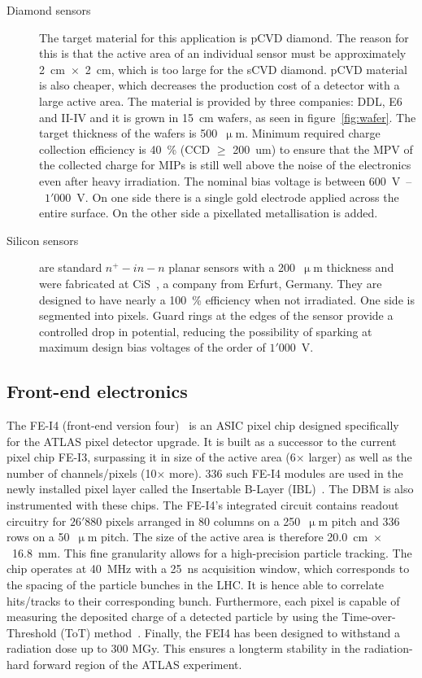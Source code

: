 \begin{description}
\item[Diamond sensors] The target material for this application is pCVD diamond. The reason for this is that the active area of an individual sensor must be approximately 2~cm~$\times$~2~cm, which is too large for the sCVD diamond. pCVD material is also cheaper, which decreases the production cost of a detector with a large active area. The material is provided by three companies: DDL, E6 and II-IV and it is grown in 15~cm wafers, as seen in figure~\ref{fig:wafer}. The target thickness of the wafers is 500~$\upmu$m. Minimum required charge collection efficiency is 40~\% (CCD $\geq$ 200~um) to ensure that the MPV of the collected charge for MIPs is still well above the noise of the electronics even after heavy irradiation. The nominal bias voltage is between 600~V~--~$1'000$~V. On one side there is a single gold electrode applied across the entire surface. On the other side a pixellated metallisation is added. 
\item[Silicon sensors] are standard $n^+ - in - n$ planar sensors with a 200~$\upmu$m thickness and were fabricated at CiS~\cite{CIS:00000}, a company from Erfurt, Germany. They are designed to have nearly a 100~\% efficiency when not irradiated. 
One side is segmented into pixels. Guard rings at the edges of the sensor provide a controlled drop in potential, reducing the possibility of sparking at maximum design bias voltages of the order of $1'000$~V.
\end{description}



\subsection{Front-end electronics}
The FE-I4 (front-end version four)~\cite{Albert:1477014} is an ASIC pixel chip designed specifically for the ATLAS pixel detector upgrade. It is built as a successor to the current pixel chip FE-I3, surpassing it in size of the active area (6$\times$ larger) as well as the number of channels/pixels (10$\times$ more). 336 such FE-I4 modules are used in the newly installed pixel layer called the Insertable B-Layer (IBL)~\cite{Huegging:1314083}. The DBM is also instrumented with these chips. The FE-I4's integrated circuit contains readout circuitry for $26'880$ pixels arranged in 80 columns on a 250~$\upmu$m pitch and 336 rows on a 50~$\upmu$m pitch. The size of the active area is therefore 20.0~cm~$\times$~16.8~mm. This fine granularity allows for a high-precision particle tracking. The chip operates at 40~MHz with a 25~ns acquisition window, which corresponds to the spacing of the particle bunches in the LHC. It is hence able to correlate hits/tracks to their corresponding bunch. Furthermore, each pixel is capable of measuring the deposited charge of a detected particle by using the Time-over-Threshold (ToT) method~\cite{1748-0221-7-11-P11010}. Finally, the FEI4 has been designed to withstand a radiation dose up to 300 MGy. This ensures a longterm stability in the radiation-hard forward region of the ATLAS experiment.

